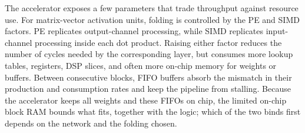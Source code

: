 The accelerator exposes a few parameters that trade throughput against resource
use. For matrix-vector activation units, folding is controlled by the PE and SIMD
factors. PE replicates output-channel processing, while SIMD replicates
input-channel processing inside each dot product. Raising either factor reduces
the number of cycles needed by the corresponding layer, but consumes more lookup
tables, registers, DSP slices, and often more on-chip memory for weights or
buffers. Between consecutive blocks, FIFO buffers absorb the mismatch in their
production and consumption rates and keep the pipeline from stalling. Because the
accelerator keeps all weights and these FIFOs on chip, the limited on-chip block
RAM bounds what fits, together with the logic; which of the two binds first
depends on the network and the folding chosen.
